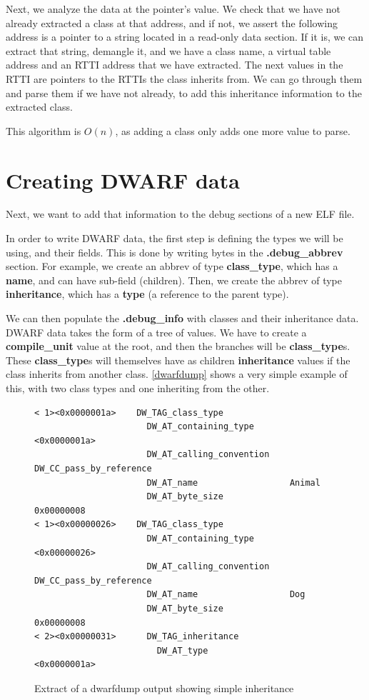\documentclass[a4paper,11pt,oneside]{report}
\begin{document}
Next, we analyze the data at the pointer's value.
We check that we have not already extracted a class at that address, and if
not, we assert the following address is a pointer to a string located in a
read-only data section.
If it is, we can extract that string, demangle it, and we have a class name,
a virtual table address and an RTTI address that we have extracted.
The next values in the RTTI are pointers to the RTTIs the class inherits from.
We can go through them and parse them if we have not already, to add this 
inheritance information to the extracted class.

This algorithm is $O(n)$, as adding a class only adds one more value to parse.

\section{Creating DWARF data}
\label{dwarfimplementation}

Next, we want to add that information to the debug sections of a new ELF file.

In order to write DWARF data, the first step is defining the types we will be 
using, and their fields.
This is done by writing bytes in the \textbf{.debug\_abbrev} section.
For example, we create an abbrev of type \textbf{class\_type}, which has a 
\textbf{name}, and can have sub-field (children).
Then, we create the abbrev of type \textbf{inheritance}, which has a 
\textbf{type} (a reference to the parent type).

We can then populate the \textbf{.debug\_info} with classes and their 
inheritance data.
DWARF data takes the form of a tree of values. We have to create a 
\textbf{compile\_unit} value at the root, and then the branches will be 
\textbf{class\_type}s.
These \textbf{class\_type}s will themselves have as children 
\textbf{inheritance} values if the class inherits from another class.
\autoref{dwarfdump} shows a very simple example of this, with two class types 
and one inheriting from the other.

\begin{figure}[h]
\begin{lstlisting}
< 1><0x0000001a>    DW_TAG_class_type
                      DW_AT_containing_type       <0x0000001a>
                      DW_AT_calling_convention    DW_CC_pass_by_reference
                      DW_AT_name                  Animal
                      DW_AT_byte_size             0x00000008
< 1><0x00000026>    DW_TAG_class_type
                      DW_AT_containing_type       <0x00000026>
                      DW_AT_calling_convention    DW_CC_pass_by_reference
                      DW_AT_name                  Dog
                      DW_AT_byte_size             0x00000008
< 2><0x00000031>      DW_TAG_inheritance
                        DW_AT_type                  <0x0000001a>
\end{lstlisting}
\caption{Extract of a dwarfdump output showing simple inheritance}
\label{dwarfdump}
\end{figure}
\end{document}
